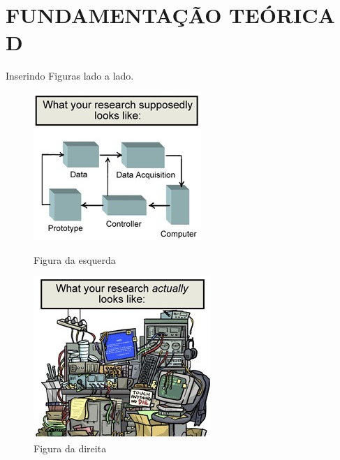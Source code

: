 \section{FUNDAMENTAÇÃO TEÓRICA D}
Inserindo Figuras lado a lado.
	\begin{figure}[!htb]
	
\begin{minipage}[b]{0.40\linewidth}
\includegraphics[width=\linewidth]{figuras/figura-1}
\caption{Figura da esquerda}
\label{fig1}
\end{minipage} \hfill
\begin{minipage}[b]{0.40\linewidth}
\includegraphics[width=\linewidth]{figuras/figura-2}
\caption{Figura da direita}
\label{fig2}
\end{minipage}
\end{figure}



